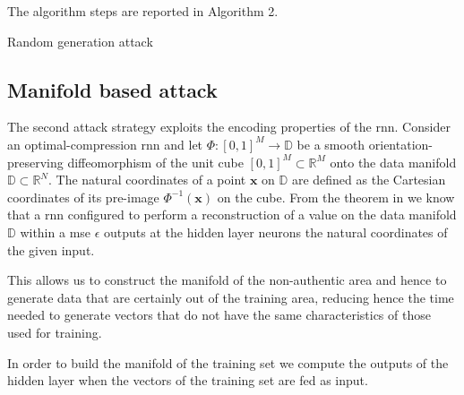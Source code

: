 \documentclass[draftcls,onecolumn,12pt]{IEEEtran}
\begin{document}
The algorithm steps are reported in Algorithm 2.

\begin{algorithm}[t]
  \scriptsize

 

    
 \caption{Random generation attack}
\end{algorithm}


\subsection{Manifold based attack}
The second attack strategy exploits the encoding properties of the \ac{rnn}. Consider an optimal-compression \ac{rnn} \cite{hecht-95} and let $\Phi:[0,1]^M \to \mathbb{D}$ be a smooth orientation-preserving diffeomorphism of the unit cube $[0,1]^M \subset \mathbb{R}^M$ onto the data manifold $\mathbb{D} \subset \mathbb{R}^N$. The natural coordinates of a point $\bm{x}$ on $\mathbb{D}$ are defined as the Cartesian coordinates of its pre-image $\Phi^{-1}(\bm{x})$ on the cube. From the theorem in \cite{hecht-95} we know that a \ac{rnn} configured to perform a reconstruction of a value on the data manifold $\mathbb{D}$ within a \ac{mse} $\epsilon$ outputs at the hidden layer neurons the natural coordinates of the given input.

This allows us to construct the manifold of the non-authentic area and hence to generate data that are certainly out of the training area, reducing hence the time needed to generate vectors that do not have the same characteristics of those used for training.

In order to build the manifold of the training set we compute the outputs of the hidden layer when the vectors of the training set are fed as input. 
\end{document}
